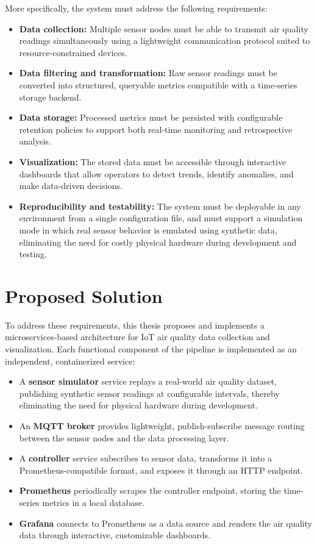 More specifically, the system must address the following requirements:

\begin{itemize}
    \item \textbf{Data collection:} Multiple sensor nodes must be able to transmit air quality readings simultaneously using a lightweight communication protocol suited to resource-constrained devices.
    \item \textbf{Data filtering and transformation:} Raw sensor readings must be converted into structured, queryable metrics compatible with a time-series storage backend.
    \item \textbf{Data storage:} Processed metrics must be persisted with configurable retention policies to support both real-time monitoring and retrospective analysis.
    \item \textbf{Visualization:} The stored data must be accessible through interactive dashboards that allow operators to detect trends, identify anomalies, and make data-driven decisions.
    \item \textbf{Reproducibility and testability:} The system must be deployable in any environment from a single configuration file, and must support a simulation mode in which real sensor behavior is emulated using synthetic data, eliminating the need for costly physical hardware during development and testing.
\end{itemize}

\section{Proposed Solution}

To address these requirements, this thesis proposes and implements a microservices-based architecture for IoT air quality data collection and visualization. Each functional component of the pipeline is implemented as an independent, containerized service:

\begin{itemize}
    \item A \textbf{sensor simulator} service replays a real-world air quality dataset, publishing synthetic sensor readings at configurable intervals, thereby eliminating the need for physical hardware during development.
    \item An \textbf{MQTT broker} provides lightweight, publish-subscribe message routing between the sensor nodes and the data processing layer.
    \item A \textbf{controller} service subscribes to sensor data, transforms it into a Prometheus-compatible format, and exposes it through an HTTP endpoint.
    \item \textbf{Prometheus} periodically scrapes the controller endpoint, storing the time-series metrics in a local database.
    \item \textbf{Grafana} connects to Prometheus as a data source and renders the air quality data through interactive, customizable dashboards.
\end{itemize}

